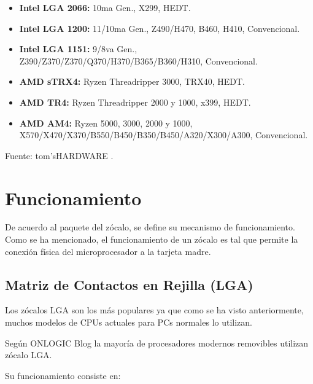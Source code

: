 \documentclass[conference]{IEEEtran}
\begin{document}
    \begin{itemize}
        \item \textbf{Intel LGA 2066:} 10ma Gen., X299, HEDT.
        \item \textbf{Intel LGA 1200:} 11/10ma Gen., Z490/H470, B460, H410,
        Convencional.
        \item \textbf{Intel LGA 1151:} 9/8va Gen.,
        Z390/Z370/Z370/Q370/H370/B365/B360/H310, Convencional.
        \item \textbf{AMD sTRX4:} Ryzen Threadripper 3000, TRX40, HEDT.
        \item \textbf{AMD TR4:} Ryzen Threadripper 2000 y 1000, x399, HEDT.
        \item \textbf{AMD AM4:} Ryzen 5000, 3000, 2000 y 1000,
        X570/X470/X370/B550/B450/B350/B450/A320/X300/A300, Convencional.
    \end{itemize}

    \small Fuente: tom'sHARDWARE \cite{harding-2021}.

    \section{Funcionamiento}

    De acuerdo al paquete del zócalo, se define su mecanismo de
    funcionamiento. Como se ha mencionado, el funcionamiento de un zócalo es
    tal que permite la conexión física del microprocesador a la tarjeta madre.

    \subsection{Matriz de Contactos en Rejilla (LGA)}

    Los zócalos LGA son los más populares ya que como se ha visto
    anteriormente, muchos modelos de CPUs actuales para PCs normales lo
    utilizan.

    \bigbreak

    Según ONLOGIC Blog \cite{fanton-2021} la mayoría de procesadores modernos
    removibles utilizan zócalo LGA.

    \bigbreak

    Su funcionamiento consiste en:

    \bigbreak
\end{document}
